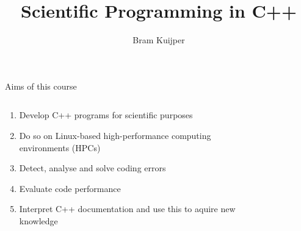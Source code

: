 \documentclass{beamer}
\title{Scientific Programming in C++}
\author{Bram Kuijper}
\date{}
\begin{document}
\begin{frame}
\titlepage
    \vspace{-.2\textheight}
    \begin{center}
    
    \end{center}
\end{frame}
\begin{frame}{Aims of this course}
    \begin{columns}
        \begin{column}{0.5\textwidth}
            \begin{enumerate}
                \item<1-> Develop C++ programs for scientific purposes
                \item<2-> Do so on Linux-based high-performance computing environments (HPCs) 
                \item<3-> Detect, analyse and solve coding errors
                \item<4-> Evaluate code performance
                \item<5-> Interpret C++ documentation and use this to aquire new knowledge 
            \end{enumerate}
        \end{column}
        \begin{column}{0.5\textwidth}
            \begin{figure}

\end{figure}
\end{column}
\end{columns}
\end{frame}
\end{document}

